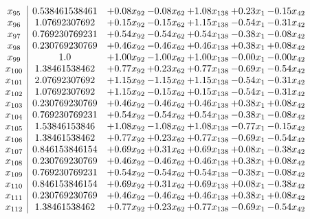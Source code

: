 \documentclass[8pt]{article}
\begin{document}
\[\begin{array}{c| c c@{\hskip 2pt} c@{\hskip 2pt} c@{\hskip 2pt} c@{\hskip 2pt} c@{\hskip 2pt} }
 x_{95}   &  0.538461538461 & +  0.08 x_{92} & -0.08 x_{62} & +  1.08 x_{138} & +  0.23 x_{1} & -0.15 x_{42}\\
 x_{96}   &  1.07692307692 & +  0.15 x_{92} & -0.15 x_{62} & +  1.15 x_{138} & -0.54 x_{1} & -0.31 x_{42}\\
 x_{97}   &  0.769230769231 & +  0.54 x_{92} & -0.54 x_{62} & +  0.54 x_{138} & -0.38 x_{1} & -0.08 x_{42}\\
 x_{98}   &  0.230769230769 & +  0.46 x_{92} & -0.46 x_{62} & +  0.46 x_{138} & +  0.38 x_{1} & +  0.08 x_{42}\\
 x_{99}   &  1.0 & +  1.00 x_{92} & -1.00 x_{62} & +  1.00 x_{138} & -0.00 x_{1} & -0.00 x_{42}\\
 x_{100}   &  1.38461538462 & +  0.77 x_{92} & +  0.23 x_{62} & +  0.77 x_{138} & -0.69 x_{1} & -0.54 x_{42}\\
 x_{101}   &  2.07692307692 & +  1.15 x_{92} & -1.15 x_{62} & +  1.15 x_{138} & -0.54 x_{1} & -0.31 x_{42}\\
 x_{102}   &  1.07692307692 & +  1.15 x_{92} & -0.15 x_{62} & +  0.15 x_{138} & -0.54 x_{1} & -0.31 x_{42}\\
 x_{103}   &  0.230769230769 & +  0.46 x_{92} & -0.46 x_{62} & +  0.46 x_{138} & +  0.38 x_{1} & +  0.08 x_{42}\\
 x_{104}   &  0.769230769231 & +  0.54 x_{92} & -0.54 x_{62} & +  0.54 x_{138} & -0.38 x_{1} & -0.08 x_{42}\\
 x_{105}   &  1.53846153846 & +  1.08 x_{92} & -1.08 x_{62} & +  1.08 x_{138} & -0.77 x_{1} & -0.15 x_{42}\\
 x_{106}   &  1.38461538462 & +  0.77 x_{92} & +  0.23 x_{62} & +  0.77 x_{138} & -0.69 x_{1} & -0.54 x_{42}\\
 x_{107}   &  0.846153846154 & +  0.69 x_{92} & +  0.31 x_{62} & +  0.69 x_{138} & +  0.08 x_{1} & -0.38 x_{42}\\
 x_{108}   &  0.230769230769 & +  0.46 x_{92} & -0.46 x_{62} & +  0.46 x_{138} & +  0.38 x_{1} & +  0.08 x_{42}\\
 x_{109}   &  0.769230769231 & +  0.54 x_{92} & -0.54 x_{62} & +  0.54 x_{138} & -0.38 x_{1} & -0.08 x_{42}\\
 x_{110}   &  0.846153846154 & +  0.69 x_{92} & +  0.31 x_{62} & +  0.69 x_{138} & +  0.08 x_{1} & -0.38 x_{42}\\
 x_{111}   &  0.230769230769 & +  0.46 x_{92} & -0.46 x_{62} & +  0.46 x_{138} & +  0.38 x_{1} & +  0.08 x_{42}\\
 x_{112}   &  1.38461538462 & +  0.77 x_{92} & +  0.23 x_{62} & +  0.77 x_{138} & -0.69 x_{1} & -0.54 x_{42}\\

\end{array}\]
\end{document}
